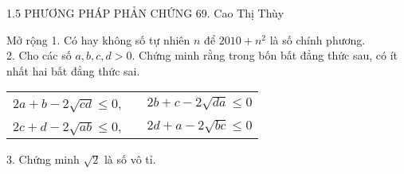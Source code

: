 \begin{frame}{1.5 PHƯƠNG PHÁP PHẢN CHỨNG \hspace{3cm}  69. Cao Thị Thùy} 
\begin{block}{Mở rộng}
1. Có hay không số tự nhiên $n$ để $2010+n^2$ là số chính phương. \\
2. Cho các số $a,b,c,d>0$. Chứng minh rằng trong bốn bất đẳng thức sau, có ít nhất hai bất đẳng thức sai.\\
\begin{table}[]
    \centering
    \begin{tabular}{ccc}
       $2a+b-2\sqrt{cd} \leqslant 0$,  && $2b+c-2\sqrt{da}\leqslant 0$ \\
        $2c+d-2\sqrt{ab}\leqslant 0$, && $2d+a-2\sqrt{bc}\leqslant 0$
    \end{tabular}
    \label{tab:my_label}
\end{table}
3. Chứng minh $\sqrt{2}$ là số vô tỉ.
\end{block} 
\end{frame} 